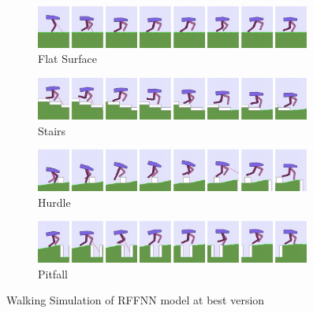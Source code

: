 \begin{figure}
	\centering
	\begin{subfigure}{.9\textwidth}
		\centering
		\includegraphics[width=0.99\textwidth]{figures/bipedal/anim/ff_flat.png}
		\caption{Flat Surface}
		\label{fig:anim_rffnn_flat}
	\end{subfigure}
	\begin{subfigure}{.9\textwidth}
		\centering
		\includegraphics[width=0.99\textwidth]{figures/bipedal/anim/ff_stairs.png}
		\caption{Stairs}
		\label{fig:anim_rffnn_stairs}
	\end{subfigure}
	\begin{subfigure}{.9\textwidth}
		\centering
		\includegraphics[width=0.99\textwidth]{figures/bipedal/anim/ff_hurdle.png}
		\caption{Hurdle}
		\label{fig:anim_rffnn_hurdle}
	\end{subfigure}
	\begin{subfigure}{.9\textwidth}
		\centering
		\includegraphics[width=0.99\textwidth]{figures/bipedal/anim/ff_pitfall.png}
		\caption{Pitfall}
		\label{fig:anim_rffnn_pitfall}
	\end{subfigure}
	\caption{Walking Simulation of RFFNN model at best version}
	\label{fig:rffnn_simulation}
\end{figure}
%
